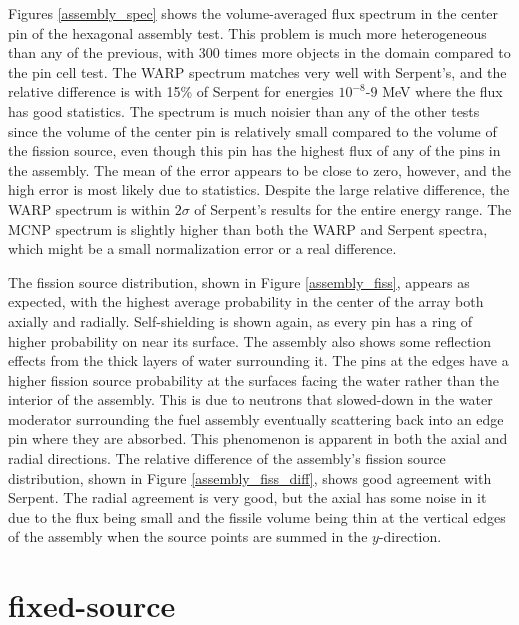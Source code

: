 Figures \ref{assembly_spec} shows the volume-averaged flux spectrum in the center pin of the hexagonal assembly test.  This problem is much more heterogeneous than any of the previous, with 300 times more objects in the domain compared to the pin cell test.  The WARP spectrum matches very well with Serpent's, and the relative difference is with 15\% of Serpent  for energies $10^{-8}$-$9$ MeV where the flux has good statistics.  The spectrum is much noisier than any of the other tests since the volume of the center pin is relatively small compared to the volume of the fission source, even though this pin has the highest flux of any of the pins in the assembly.  The mean of the error appears to be close to zero, however, and the high error is most likely due to statistics.  Despite the large relative difference, the WARP spectrum is within $2\sigma$ of Serpent's results for the entire energy range.  The MCNP spectrum is slightly higher than both the WARP and Serpent spectra, which might be a small normalization error or a real difference.  

The fission source distribution, shown in Figure \ref{assembly_fiss}, appears as expected, with the highest average probability in the center of the array both axially and radially.  Self-shielding is shown again, as every pin has a ring of higher probability on near its surface.  The assembly also shows some reflection effects from the thick layers of water surrounding it.  The pins at the edges have a higher fission source probability at the surfaces facing the water rather than the interior of the assembly.  This is due to neutrons that slowed-down in the water moderator surrounding the fuel assembly eventually scattering back into an edge pin where they are absorbed.  This phenomenon is apparent in both the axial and radial directions.  The relative difference of the assembly's fission source distribution, shown in Figure \ref{assembly_fiss_diff}, shows good agreement with Serpent.  The radial agreement is very good, but the axial has some noise in it due to the flux being small and the fissile volume being thin at the vertical edges of the assembly when the source points are summed in the $y$-direction.  


\section{fixed-source}

